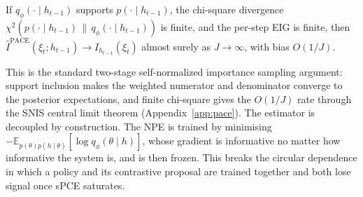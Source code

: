 
\begin{theorem}[Consistency]
\label{thm:consistency}
If $q_\phi(\cdot\mid h_{t-1})$ supports $p(\cdot\mid h_{t-1})$, the chi-square
divergence $\chi^2(p(\cdot\mid h_{t-1})\,\|\,q_\phi(\cdot\mid h_{t-1}))$ is finite, and
the per-step EIG is finite, then $\hat I^{\mathrm{PACE}}(\xi_t;h_{t-1})\to I_{h_{t-1}}(\xi_t)$
almost surely as $J\to\infty$, with bias $O(1/J)$.
\end{theorem}

This is the standard two-stage self-normalized importance sampling argument: support
inclusion makes the weighted numerator and denominator converge to the posterior
expectations, and finite chi-square gives the $O(1/J)$ rate through the SNIS central
limit theorem (Appendix~\ref{app:pace}). The estimator is decoupled by construction.
The NPE is trained by minimising $-\mathbb{E}_{p(\theta)p(h\mid\theta)}[\log q_\phi(\theta\mid h)]$,
whose gradient is informative no matter how informative the system is, and is then
frozen. This breaks the circular dependence in which a policy and its contrastive
proposal are trained together and both lose signal once sPCE saturates.

